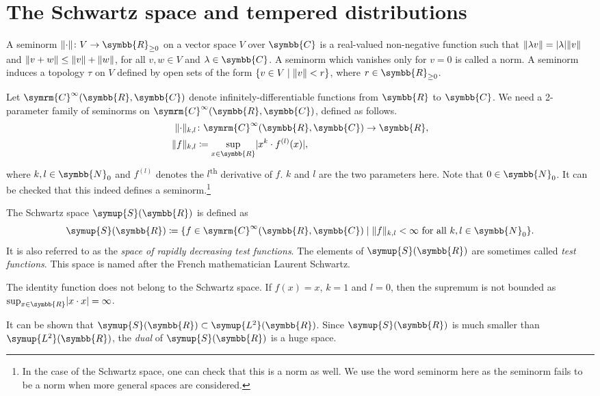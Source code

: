 \documentclass[11pt, a4paper]{article}
\theoremstyle{definition}
\newcommand{\ltwo}{\symup{L^2}}
\newcommand{\rr}{\symbb{R}}
\newcommand{\cc}{\symbb{C}}
\newcommand{\nn}{\symbb{N}_0}
\newcommand{\ltwor}{\ltwo(\rr)}
\newcommand{\schwartz}{\symup{S}}
\newcommand{\schwartzr}{\schwartz(\rr)}
\newcommand{\cinfinity}{\symrm{C}^\infty}
\DeclarePairedDelimiter{\norm}{\lVert}{\rVert}
\DeclarePairedDelimiter{\abs}{\lvert}{\rvert}
\begin{document}
    \section{The Schwartz space and tempered distributions}

    A seminorm $\norm{\cdot} \colon V \rightarrow \rr_{\geq 0}$ on a vector space $V$ over $\cc$ is a real-valued non-negative function such that $\norm{\lambda v} = \abs{\lambda} \norm{v}$ and $\norm{v + w} \leq \norm{v} + \norm{w}$, for all $v,w \in V$ and $\lambda \in \cc$. A seminorm which vanishes only for $v=0$ is called a norm. A seminorm induces a topology $\tau$ on $V$ defined by open sets of the form $\{v\in V \mid \norm{v} < r\}$, where $r \in \rr_{\geq 0}$.

    Let $\cinfinity(\rr, \cc)$ denote infinitely-differentiable functions from $\rr$ to $\cc$. We need a 2-parameter family of seminorms on $\cinfinity(\rr, \cc)$, defined as follows.
    \begin{align*}
        \norm{\cdot}_{k,l} &\colon \cinfinity(\rr, \cc) \rightarrow \rr,\\
        \norm{f}_{k,l} &\coloneq \sup_{x \in \rr}\abs{x^k \cdot f^{(l)}(x)},
    \end{align*}
    where $k, l \in \nn$ and $f^{(l)}$ denotes the $l$\textsuperscript{th} derivative of $f$. $k$ and $l$ are the two parameters here. Note that $0 \in \nn$. It can be checked that this indeed defines a seminorm.\footnote{In the case of the Schwartz space, one can check that this is a norm as well. We use the word seminorm here as the seminorm fails to be a norm when more general spaces are considered.}

    The Schwartz space $\schwartzr$ is defined as
    \[
    \schwartzr \coloneq \{f \in \cinfinity(\rr, \cc) \mid \norm{f}_{k,l} < \infty \text{ for all } k, l \in \nn\}.
    \]
    It is also referred to as the \textit{space of rapidly decreasing test functions}. The elements of $\schwartzr$ are sometimes called \textit{test functions}. This space is named after the French mathematician Laurent Schwartz.

    The identity function does not belong to the Schwartz space. If $f(x) = x$, $k=1$ and $l=0$, then the supremum is not bounded as $\sup_{x \in \rr} \abs{x \cdot x} = \infty$.

    It can be shown that $\schwartzr \subset \ltwor$. Since $\schwartzr$ is much smaller than $\ltwor$, the \textit{dual} of $\schwartzr$ is a huge space.
\end{document}
